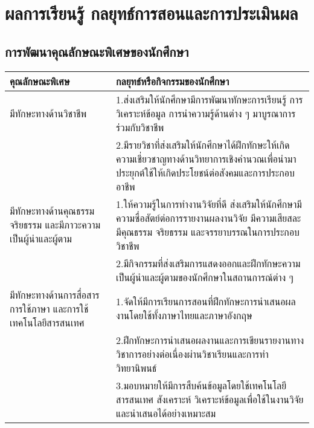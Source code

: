 
\chapter{ผลการเรียนรู้ กลยุทธ์การสอนและการประเมินผล}

\section{การพัฒนาคุณลักษณะพิเศษของนักศึกษา}

\renewcommand{\arraystretch}{1.2}
\begin{tabular}{|p{}|p{}|}
\hline
\textbf{คุณลักษณะพิเศษ} & \textbf{กลยุทธ์หรือกิจกรรมของนักศึกษา} \\ 
\hline	

 มีทักษะทางด้านวิชาชีพ & 1.ส่งเสริมให้นักศึกษามีการพัฒนาทักษะการเรียนรู้ การวิเคราะห์ข้อมูล การนำความรู้ด้านต่าง ๆ มาบูรณาการร่วมกับวิชาชีพ\\
 & 2.มีรายวิชาที่ส่งเสริมให้นักศึกษาได้ฝึกทักษะให้เกิดความเชี่ยวชาญทางด้านวิทยาการเชิงคำนวณเพื่อนำมาประยุกต์ใช้ให้เกิดประโยชน์ต่อสังคมและการประกอบอาชีพ  \\  \hline
 มีทักษะทางด้านคุณธรรม จริยธรรม และมีภาวะความเป็นผู้นำและผู้ตาม & 1.ให้ความรู้ในการทำงานวิจัยที่ดี ส่งเสริมให้นักศึกษามีความซื่อสัตย์ต่อการรายงานผลงานวิจัย มีความเสียสละ มีคุณธรรม จริยธรรม และจรรยาบรรณในการประกอบวิชาชีพ \\
 & 2.มีกิจกรรมที่ส่งเสริมการแสดงออกและฝึกทักษะความเป็นผู้นำและผู้ตามของนักศึกษาในสถานการณ์ต่าง ๆ \\ \hline
 มีทักษะทางด้านการสื่อสาร การใช้ภาษา และการใช้เทคโนโลยีสารสนเทศ & 1.จัดให้มีการเรียนการสอนที่ฝึกทักษะการนำเสนอผลงานโดยใช้ทั้งภาษาไทยและภาษาอังกฤษ \\
 & 2.ฝึกทักษะการนำเสนอผลงานและการเขียนรายงานทางวิชาการอย่างต่อเนื่องผ่านวิชาเรียนและการทำวิทยานิพนธ์ \\
 & 3.มอบหมายให้มีการสืบค้นข้อมูลโดยใช้เทคโนโลยีสารสนเทศ สังเคราะห์ วิเคราะห์ข้อมูลเพื่อใช้ในงานวิจัยและนำเสนอได้อย่างเหมาะสม \\
\hline
 
\end{tabular}

